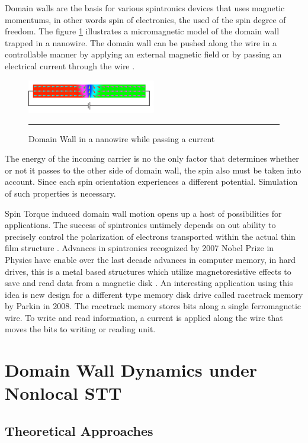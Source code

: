 Domain walls are the basis for various spintronics devices that uses magnetic momentums, in other words spin of electronics, the used of the spin degree of freedom. The figure \ref{fig:DWspin} illustrates a micromagnetic model of the domain wall trapped in a nanowire. The domain wall can be pushed along the wire in a controllable manner by applying an external magnetic field or by passing an electrical current through the wire \cite{dwwire}.

\begin{figure}[htbp]
	\centering
		\includegraphics[width=0.5\textwidth]{Figures/DWspin.png}
		\rule{35em}{0.5pt}
	\caption[Domain Wall nanowire]{Domain Wall in a nanowire while passing a current}
	\label{fig:DWspin}
\end{figure}

The energy of the incoming  carrier is no the only factor that determines whether or not it passes to the other side of domain wall, the spin also must be taken into account. Since each spin orientation experiences a different potential. Simulation of such properties is necessary.

Spin Torque induced domain wall motion opens up a host of possibilities for applications. The success of spintronics untimely depends on out ability to precisely  control the polarization of electrons transported within the actual thin film structure \cite{ferro}. Advances in spintronics recognized by 2007 Nobel Prize in Physics have enable over the last decade advances in computer memory, in hard drives, this is a metal based structures which utilize magnetoresistive effects to save and read data from a magnetic disk \cite{handbookspin}. An interesting application using this idea is new design for a different type memory disk drive called racetrack memory by Parkin in 2008\cite{racetrack}. The racetrack memory stores bits along a single ferromagnetic wire. To write and read information, a current is applied along the wire that moves the bits to writing or reading unit.
 
\section{Domain Wall Dynamics under Nonlocal STT}


\subsection{Theoretical Approaches}

